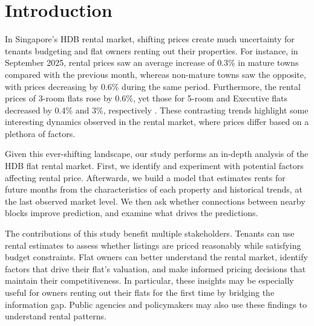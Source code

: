\section{Introduction}

In Singapore's HDB rental market, shifting prices create much uncertainty for tenants budgeting and flat owners renting out their properties. For instance, in September 2025, rental prices saw an average increase of 0.3\% in mature towns compared with the previous month, whereas non-mature towns saw the opposite, with prices decreasing by 0.6\% during the same period. Furthermore, the rental prices of 3-room flats rose by 0.6\%, yet those for 5-room and Executive flats decreased by 0.4\% and 3\%, respectively \cite{David:2025:Rental}. These contrasting trends highlight some interesting dynamics observed in the rental market, where prices differ based on a plethora of factors.

Given this ever-shifting landscape, our study performs an in-depth analysis of the HDB flat rental market. First, we identify and experiment with potential factors affecting rental price. Afterwards, we build a model that estimates rents for future months from the characteristics of each property and historical trends, at the last observed market level. We then ask whether connections between nearby blocks improve prediction, and examine what drives the predictions.

The contributions of this study benefit multiple stakeholders. Tenants can use rental estimates to assess whether listings are priced reasonably while satisfying budget constraints. Flat owners can better understand the rental market, identify factors that drive their flat's valuation, and make informed pricing decisions that maintain their competitiveness. In particular, these insights may be especially useful for owners renting out their flats for the first time by bridging the information gap. Public agencies and policymakers may also use these findings to understand rental patterns.

